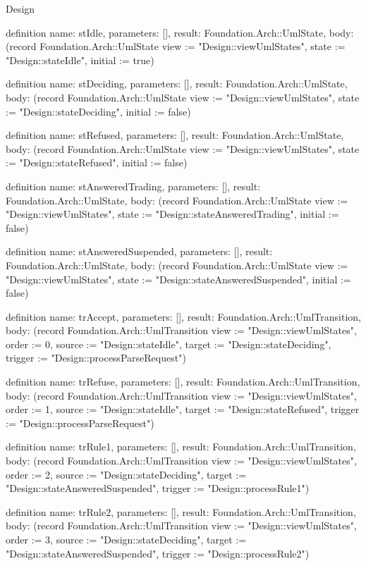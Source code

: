 \begin{lexlean}{Design}
\begin{semanticmodule}
definition{
  name: stIdle,
  parameters: [],
  result: Foundation.Arch::UmlState,
  body: (record Foundation.Arch::UmlState {view := "Design::viewUmlStates", state := "Design::stateIdle", initial := true})
}

definition{
  name: stDeciding,
  parameters: [],
  result: Foundation.Arch::UmlState,
  body: (record Foundation.Arch::UmlState {view := "Design::viewUmlStates", state := "Design::stateDeciding", initial := false})
}

definition{
  name: stRefused,
  parameters: [],
  result: Foundation.Arch::UmlState,
  body: (record Foundation.Arch::UmlState {view := "Design::viewUmlStates", state := "Design::stateRefused", initial := false})
}

definition{
  name: stAnsweredTrading,
  parameters: [],
  result: Foundation.Arch::UmlState,
  body: (record Foundation.Arch::UmlState {view := "Design::viewUmlStates", state := "Design::stateAnsweredTrading", initial := false})
}

definition{
  name: stAnsweredSuspended,
  parameters: [],
  result: Foundation.Arch::UmlState,
  body: (record Foundation.Arch::UmlState {view := "Design::viewUmlStates", state := "Design::stateAnsweredSuspended", initial := false})
}

definition{
  name: trAccept,
  parameters: [],
  result: Foundation.Arch::UmlTransition,
  body: (record Foundation.Arch::UmlTransition {view := "Design::viewUmlStates", order := 0, source := "Design::stateIdle", target := "Design::stateDeciding", trigger := "Design::processParseRequest"})
}

definition{
  name: trRefuse,
  parameters: [],
  result: Foundation.Arch::UmlTransition,
  body: (record Foundation.Arch::UmlTransition {view := "Design::viewUmlStates", order := 1, source := "Design::stateIdle", target := "Design::stateRefused", trigger := "Design::processParseRequest"})
}

definition{
  name: trRule1,
  parameters: [],
  result: Foundation.Arch::UmlTransition,
  body: (record Foundation.Arch::UmlTransition {view := "Design::viewUmlStates", order := 2, source := "Design::stateDeciding", target := "Design::stateAnsweredSuspended", trigger := "Design::processRule1"})
}

definition{
  name: trRule2,
  parameters: [],
  result: Foundation.Arch::UmlTransition,
  body: (record Foundation.Arch::UmlTransition {view := "Design::viewUmlStates", order := 3, source := "Design::stateDeciding", target := "Design::stateAnsweredSuspended", trigger := "Design::processRule2"})
}


\end{semanticmodule}
\end{lexlean}
